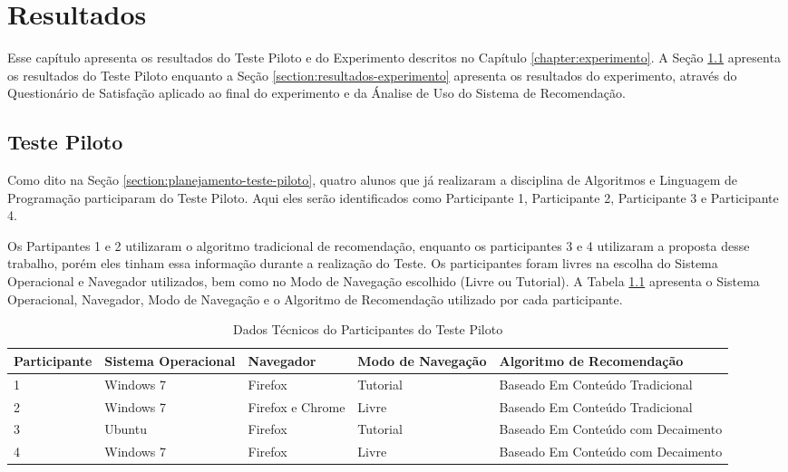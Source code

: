 \chapter{Resultados}\label{chapter:resultados}

Esse capítulo apresenta os resultados do Teste Piloto e do Experimento descritos no Capítulo \ref{chapter:experimento}.
A Seção \ref{section:resultados-teste-piloto} apresenta os resultados do Teste Piloto enquanto a Seção \ref{section:resultados-experimento}
apresenta os resultados do experimento, através do Questionário de Satisfação aplicado ao final do experimento e da Ánalise
de Uso do Sistema de Recomendação.

\section{Teste Piloto}\label{section:resultados-teste-piloto}

Como dito na Seção \ref{section:planejamento-teste-piloto}, quatro alunos que já realizaram a disciplina de Algoritmos e
Linguagem de Programação participaram do Teste Piloto. Aqui eles serão identificados como Participante 1, Participante 2,
Participante 3 e Participante 4.

Os Partipantes 1 e 2 utilizaram o algoritmo tradicional de recomendação, enquanto os participantes 3 e 4 utilizaram a
proposta desse trabalho, porém eles tinham essa informação durante a realização do Teste. Os participantes foram livres na escolha do Sistema Operacional e Navegador utilizados, bem como
no Modo de Navegação escolhido (Livre ou Tutorial). A Tabela \ref{tab:participantes-teste-piloto} apresenta o
Sistema Operacional, Navegador, Modo de Navegação e o Algoritmo de Recomendação utilizado por
cada participante.

\begin{table}[h]
\footnotesize
\caption[Dados Técnicos do Participantes do Teste Piloto]{Dados Técnicos do Participantes do Teste Piloto}
\label{tab:participantes-teste-piloto}
\centering
\begin{tabular}{|p{2cm}|p{2.5cm}|p{2.5cm}|p{2.5cm}|p{2.5cm}|}
  \hline
  \textbf{Participante} & \textbf{Sistema Operacional} & \textbf{Navegador} & \textbf{Modo de Navegação} & \textbf{Algoritmo de Recomendação} \\
  \hline
  1 & Windows 7 & Firefox & Tutorial & Baseado Em Conteúdo Tradicional \\
  \hline
  2 & Windows 7 & Firefox e Chrome & Livre & Baseado Em Conteúdo Tradicional \\
  \hline
  3 & Ubuntu & Firefox & Tutorial & Baseado Em Conteúdo com Decaimento \\
  \hline
  4 & Windows 7 & Firefox & Livre & Baseado Em Conteúdo com Decaimento \\
  \hline
\end{tabular}
\end{table}

